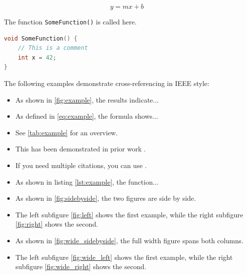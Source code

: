 \blindtext
\begin{equation}
    y = mx + b
    \label{eq:example}
\end{equation}

\blindtext
The function \texttt{SomeFunction()} is called here.

\blindtext
\begin{lstlisting}[language=C++,
                   caption={An example code listing.},
                   label={lst:example}]
void SomeFunction() {
    // This is a comment
    int x = 42;
}
\end{lstlisting}

\noindent The following examples demonstrate cross-referencing in IEEE style:

\begin{itemize}
    \item As shown in \cref{fig:example}, the results indicate...
    \item As defined in \cref{eq:example}, the formula shows...
    \item See \cref{tab:example} for an overview.
    \item This has been demonstrated in prior work \cite{test}.
    \item If you need multiple citations, you can use \cite{test, test}.
    \item As shown in listing \ref{lst:example}, the function...
    \item As shown in \cref{fig:sidebyside}, the two figures are side by side.
    \item The left subfigure \cref{fig:left} shows the first example, while the right 
    subfigure \cref{fig:right} shows the second.
    \item As shown in \cref{fig:wide_sidebyside}, the full width figure
    spans both columns. 
    \item The left subfigure \cref{fig:wide_left} shows
    the first example, while the right subfigure \cref{fig:wide_right}
    shows the second.
\end{itemize}
\blindtext